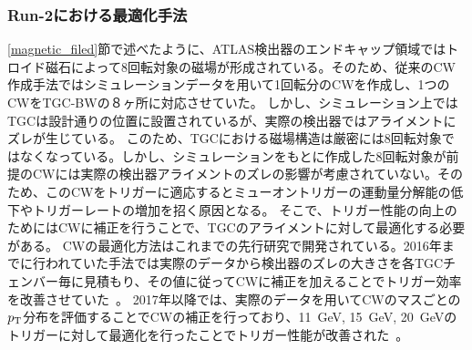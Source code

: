 \subsubsection{Run-2における最適化手法}
\ref{magnetic_filed}節で述べたように、ATLAS検出器のエンドキャップ領域ではトロイド磁石によって8回転対象の磁場が形成されている。そのため、従来のCW作成手法ではシミュレーションデータを用いて1回転分のCWを作成し、1つのCWをTGC-BWの８ヶ所に対応させていた。
しかし、シミュレーション上ではTGCは設計通りの位置に設置されているが、実際の検出器ではアライメントにズレが生じている。
このため、TGCにおける磁場構造は厳密には8回転対象ではなくなっている。しかし、シミュレーションをもとに作成した8回転対象が前提のCWには実際の検出器アライメントのズレの影響が考慮されていない。そのため、このCWをトリガーに適応するとミューオントリガーの運動量分解能の低下やトリガーレートの増加を招く原因となる。
そこで、トリガー性能の向上のためにはCWに補正を行うことで、TGCのアライメントに対して最適化する必要がある。
CWの最適化方法はこれまでの先行研究で開発されている。2016年までに行われていた手法では実際のデータから検出器のズレの大きさを各TGCチェンバー毎に見積もり、その値に従ってCWに補正を加えることでトリガー効率を改善させていた~\cite{article:yamauti-mron}。
2017年以降では、実際のデータを用いてCWのマスごとの$p_{\rm{T}}$分布を評価することでCWの補正を行っており、11~GeV, 15~GeV, 20~GeVのトリガーに対して最適化を行ったことでトリガー性能が改善された~\cite{article:kido-mron}。

